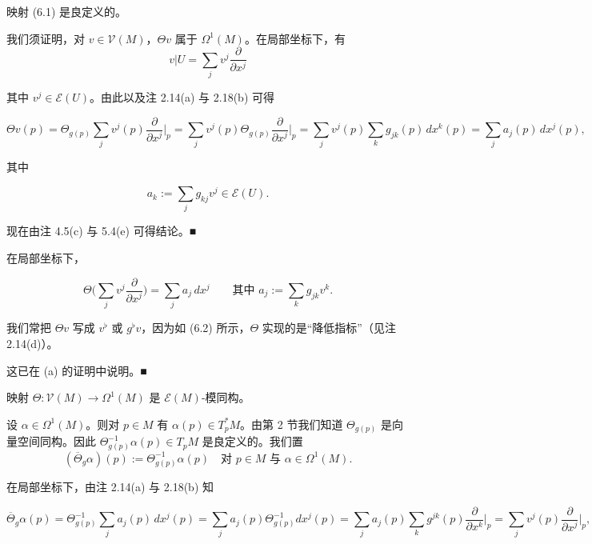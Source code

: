 \begin{remark}

\begin{items}
\item

映射 (6.1) 是良定义的。

\proofhead
我们须证明，对 $ v \in \mathcal{V}(M) $，$ \Theta v $ 属于 $ \Omega^{1}(M) $。在局部坐标下，有
\[
v|U = \sum_{j} v^{j}\frac{\partial}{\partial x^{j}}
\]

其中 $ v^{j} \in \mathcal{E}(U) $。由此以及注 2.14(a) 与 2.18(b) 可得

\[
\Theta v(p) = \Theta_{g(p)}\sum_{j} v^{j}(p)\frac{\partial}{\partial x^{j}}\Big|_{p} = \sum_{j} v^{j}(p)\Theta_{g(p)}\frac{\partial}{\partial x^{j}}\Big|_{p} = \sum_{j} v^{j}(p)\sum_{k} g_{jk}(p)\,dx^{k}(p) = \sum_{j} a_{j}(p)\,dx^{j}(p),
\]

其中

\[
a_{k} := \sum_{j} g_{kj}v^{j} \in \mathcal{E}(U).
\]

现在由注 4.5(c) 与 5.4(e) 可得结论。\nobreak\hspace{0.35em}■

\item

在局部坐标下，

\begin{equation}
\Theta\Big(\sum_{j} v^{j}\frac{\partial}{\partial x^{j}}\Big) = \sum_{j} a_{j}\,dx^{j} \qquad \text{其中 } a_{j} := \sum_{k} g_{jk}v^{k}.\tag{6.2}
\end{equation}

我们常把 $ \Theta v $ 写成 $ v^{\flat} $ 或 $ g^{\flat}v $，因为如 (6.2) 所示，$ \Theta $ 实现的是“降低指标”（见注 2.14(d)）。

\proofhead
这已在 (a) 的证明中说明。\nobreak\hspace{0.35em}■
\item

映射 $ \Theta: \mathcal{V}(M) \to \Omega^{1}(M) $ 是 $ \mathcal{E}(M) $-模同构。

\proofhead
设 $ \alpha \in \Omega^{1}(M) $。则对 $ p \in M $ 有 $ \alpha(p) \in T_{p}^{*}M $。由第 2 节我们知道 $ \Theta_{g(p)} $ 是向量空间同构。因此 $ \Theta_{g(p)}^{-1}\alpha(p) \in T_{p}M $ 是良定义的。我们置
\[
(\overline{\Theta}_{g}\alpha)(p) := \Theta_{g(p)}^{-1}\alpha(p) \quad \text{对 } p \in M \text{ 与 } \alpha \in \Omega^{1}(M).
\]

在局部坐标下，由注 2.14(a) 与 2.18(b) 知

\[
\overline{\Theta}_{g}\alpha(p) = \Theta_{g(p)}^{-1}\sum_{j} a_{j}(p)\,dx^{j}(p) = \sum_{j} a_{j}(p)\Theta_{g(p)}^{-1}dx^{j}(p) = \sum_{j} a_{j}(p)\sum_{k} g^{jk}(p)\frac{\partial}{\partial x^{k}}\Big|_{p} = \sum_{j} v^{j}(p)\frac{\partial}{\partial x^{j}}\Big|_{p},
\]


\end{items}
\end{remark}
